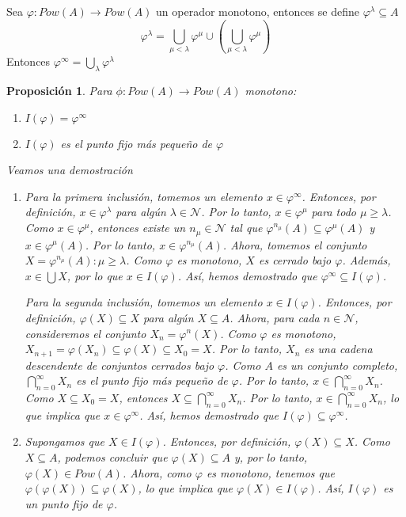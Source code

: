 \documentclass[executivepaper]{article}
\newtheorem{propo}{Proposición}[section]
\begin{document}
Sea $\varphi : Pow(A) \rightarrow Pow(A)$ un operador monotono, entonces se define $\varphi^\lambda\subseteq A$
$$\varphi^\lambda = \bigcup_{\mu<\lambda}\varphi^{\mu}\cup(\bigcup_{\mu<\lambda}\varphi^{\mu}) $$
Entonces $\varphi^{\infty}=\bigcup_{\lambda}\varphi^{\lambda}$
\begin{propo}
    Para $\phi:Pow(A)\rightarrow Pow(A)$ monotono:
    \begin{enumerate}
        \item $I(\varphi)=\varphi^{\infty}$
        \item $I(\varphi)$ es el punto fijo más pequeño de $\varphi$
    \end{enumerate}

Veamos una demostración
\begin{enumerate}
    \item Para la primera inclusión, tomemos un elemento $x \in \varphi^\infty$. Entonces, por definición, $x \in \varphi^\lambda$ para algún $\lambda \in \mathcal{N}$. Por lo tanto, $x \in \varphi^\mu$ para todo $\mu \geq \lambda$. Como $x \in \varphi^\mu$, entonces existe un $n_\mu \in \mathcal{N}$ tal que $\varphi^{n_\mu}(A) \subseteq \varphi^\mu(A)$ y $x \in \varphi^\mu(A)$. Por lo tanto, $x \in \varphi^{n_\mu}(A)$. Ahora, tomemos el conjunto $X = {\varphi^{n_\mu}(A) : \mu \geq \lambda}$. Como $\varphi$ es monotono, $X$ es cerrado bajo $\varphi$. Además, $x \in \bigcup X$, por lo que $x \in I(\varphi)$. Así, hemos demostrado que $\varphi^\infty \subseteq I(\varphi)$.

    Para la segunda inclusión, tomemos un elemento $x \in I(\varphi)$. Entonces, por definición, $\varphi(X) \subseteq X$ para algún $X \subseteq A$. Ahora, para cada $n \in \mathcal{N}$, consideremos el conjunto $X_n = \varphi^n(X)$. Como $\varphi$ es monotono, $X_{n+1} = \varphi(X_n) \subseteq \varphi(X) \subseteq X_0 = X$. Por lo tanto, ${X_n}$ es una cadena descendente de conjuntos cerrados bajo $\varphi$. Como $A$ es un conjunto completo, $\bigcap_{n=0}^\infty X_n$ es el punto fijo más pequeño de $\varphi$. Por lo tanto, $x \in \bigcap_{n=0}^\infty X_n$. Como $X \subseteq X_0 = X$, entonces $X \subseteq \bigcap_{n=0}^\infty X_n$. Por lo tanto, $x \in \bigcap_{n=0}^\infty X_n$, lo que implica que $x \in \varphi^\infty$. Así, hemos demostrado que $I(\varphi) \subseteq \varphi^\infty$.

    \item Supongamos que $X\in I(\varphi)$. Entonces, por definición, $\varphi(X)\subseteq X$. Como $X\subseteq A$, podemos concluir que $\varphi(X)\subseteq A$ y, por lo tanto, $\varphi(X)\in Pow(A)$. Ahora, como $\varphi$ es monotono, tenemos que $\varphi(\varphi(X))\subseteq \varphi(X)$, lo que implica que $\varphi(X)\in I(\varphi)$. Así, $I(\varphi)$ es un punto fijo de $\varphi$.


\end{enumerate}
\end{propo}
\end{document}
